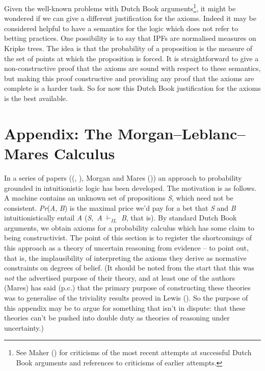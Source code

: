 \documentclass[
  11pt,
  letterpaper,
  DIV=11,
  numbers=noendperiod,
  twoside]{scrartcl}
\begin{document}
Given the well-known problems with Dutch Book arguments\footnote{See
  Maher () for criticisms of the most
  recent attempts at successful Dutch Book arguments and references to
  criticisms of earlier attempts.}, it might be wondered if we can give
a different justification for the axioms. Indeed it may be considered
helpful to have a semantics for the logic which does not refer to
betting practices. One possibility is to say that IPFs are normalised
measures on Kripke trees. The idea is that the probability of a
proposition is the measure of the set of points at which the proposition
is forced. It is straightforward to give a non-constructive proof that
the axioms are sound with respect to these semantics, but making this
proof constructive and providing any proof that the axioms are complete
is a harder task. So for now this Dutch Book justification for the
axioms is the best available.

\section*{Appendix: The Morgan--Leblanc--Mares
Calculus}\label{appendix-the-morganleblancmares-calculus}

In a series of papers ((, ), Morgan and
Mares ()) an approach to probability
grounded in intuitionistic logic has been developed. The motivation is
as follows. A machine contains an unknown set of propositions \emph{S},
which need not be consistent. \emph{Pr}(\emph{A}, \emph{B}) is the
maximal price we'd pay for a bet that \emph{S} and \emph{B}
intuitionistically entail \emph{A} (\emph{S},~\emph{A} \(\vdash_{IL}\)
\emph{B}, that is). By standard Dutch Book arguments, we obtain axioms
for a probability calculus which has some claim to being constructivist.
The point of this section is to register the shortcomings of this
approach as a theory of uncertain reasoning from evidence -- to point
out, that is, the implausibility of interpreting the axioms they derive
as normative constraints on degrees of belief. (It should be noted from
the start that this was \emph{not} the advertised purpose of their
theory, and at least one of the authors (Mares) has said (p.c.) that the
primary purpose of constructing these theories was to generalise of the
triviality results proved in Lewis (). So
the purpose of this appendix may be to argue for something that isn't in
dispute: that these theories can't be pushed into double duty as
theories of reasoning under uncertainty.)
\end{document}
